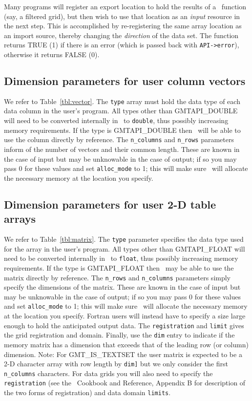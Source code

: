 \documentclass[11pt]{report}
\begin{document}
Many programs will register an export location to hold the results of a \GMT\ function (say,
a filtered grid), but then wish to use that location as an \emph{input} resource in the next
step.  This is accomplished by re-registering the same array
location as an import source, thereby changing the \emph{direction} of the data set.
The function returns TRUE (1) if there is an error (which is passed back with \texttt{API->error}),
otherwise it returns FALSE (0).

\subsection{Dimension parameters for user column vectors}
We refer to Table~\ref{tbl:vector}.  The \texttt{type} array must hold the
data type of each data column in the user's program.  All types other than GMTAPI\_DOUBLE will need
to be converted internally in \GMT\ to \texttt{double}, thus possibly increasing memory requirements.
If the type is GMTAPI\_DOUBLE then \GMT\ will be able to use the column directly by reference.  The \texttt{n\_columns}
and \texttt{n\_rows} parameters inform of the number of vectors and their common length.  These are known in
the case of input but may be unknowable in the case of output; if so you may pass 0 for these values
and set \texttt{alloc\_mode} to 1; this will make
sure \GMT\ will allocate the necessary memory at the location you specify.

\subsection{Dimension parameters for user 2-D table arrays}

We refer to Table~\ref{tbl:matrix}.  The \texttt{type} parameter specifies the
data type used for the array in the user's program.  All types other than GMTAPI\_FLOAT will need
to be converted internally in \GMT\ to \texttt{float}, thus possibly increasing memory requirements.
If the type is GMTAPI\_FLOAT then \GMT\ may be able to use the matrix directly by reference.  The \texttt{n\_rows}
and \texttt{n\_columns} parameters simply specify the dimensions of the matrix.  These are known in
the case of input but may be unknowable in the case
of output; if so you may pass 0 for these values and set \texttt{alloc\_mode} to 1; this will make
sure \GMT\ will allocate the necessary memory at the location you specify.  Fortran users
will instead have to specify a size large enough to hold the anticipated output data.
The \texttt{registration} and \texttt{limit} gives the grid registration and domain.
Finally, use the \texttt{dim} entry to indicate if the memory matrix has a dimension that
exceeds that of the leading row (or column) dimension. Note: For GMT\_IS\_TEXTSET
the user matrix is expected to be a 2-D character array with row length by \texttt{dim]}
but we only consider the first \texttt{n\_columns} characters.  For data grids you will
also need to specify the \texttt{registration}  (see the \GMT\ Cookbook and Reference,
Appendix B for description of the two forms of registration) and data domain \texttt{limits}.
\end{document}
